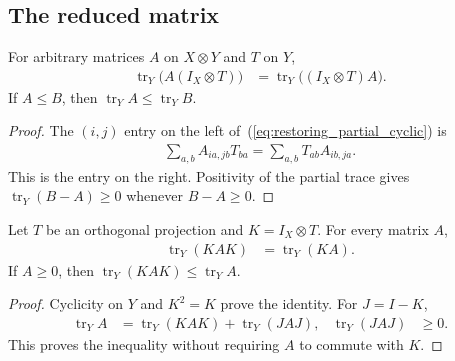 \subsection{The reduced matrix}

\begin{lemma}
    \label{lem:restoring_partial_trace}
    \leanok
    For arbitrary matrices $A$ on $X\otimes Y$ and $T$ on $Y$,
    \begin{align}
        \operatorname{tr}_Y\bigl(A(I_X\otimes T)\bigr)
        &=\operatorname{tr}_Y\bigl((I_X\otimes T)A\bigr).
        \label{eq:restoring_partial_cyclic}
    \end{align}
    If $A\le B$, then $\operatorname{tr}_Y A\le\operatorname{tr}_Y B$.
\end{lemma}
\begin{proof}\leanok
    The $(i,j)$ entry on the left of~(\ref{eq:restoring_partial_cyclic}) is
    \begin{align}
        \sum_{a,b}A_{ia,jb}T_{ba}
        =\sum_{a,b}T_{ab}A_{ib,ja}.
    \end{align}
    This is the entry on the right. Positivity of the partial trace gives
    $\operatorname{tr}_Y(B-A)\ge0$ whenever $B-A\ge0$.
\end{proof}

\begin{lemma}
    \label{lem:restoring_partial_compression}
    \leanok
    Let $T$ be an orthogonal projection and $K=I_X\otimes T$.
    For every matrix $A$,
    \begin{align}
        \operatorname{tr}_Y(KAK)&=\operatorname{tr}_Y(KA).
        \label{eq:restoring_partial_compression}
    \end{align}
    If $A\ge0$, then $\operatorname{tr}_Y(KAK)\le\operatorname{tr}_Y A$.
\end{lemma}
\begin{proof}\leanok
    Cyclicity on $Y$ and $K^2=K$ prove the identity. For $J=I-K$,
    \begin{align}
        \operatorname{tr}_Y A
        &=\operatorname{tr}_Y(KAK)+\operatorname{tr}_Y(JAJ),
        &\operatorname{tr}_Y(JAJ)&\ge0.
    \end{align}
    This proves the inequality without requiring $A$ to commute with $K$.
\end{proof}

